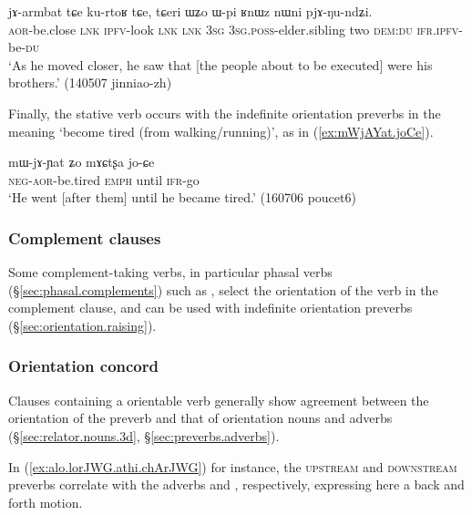 \begin{exe}
\ex \label{ex:jarmbat.kurtoR}
\gll  jɤ-armbat tɕe ku-rtoʁ tɕe, tɕeri ɯʑo ɯ-pi ʁnɯz nɯni pjɤ-ŋu-ndʑi. \\
\textsc{aor}-be.close \textsc{lnk} \textsc{ipfv}-look \textsc{lnk} \textsc{lnk} \textsc{3sg} \textsc{3sg}.\textsc{poss}-elder.sibling two \textsc{dem}:\textsc{du} \textsc{ifr}.\textsc{ipfv}-be-\textsc{du} \\
\glt `As he moved closer, he saw that [the people about to be executed] were his brothers.' (140507 jinniao-zh) 
\end{exe}

Finally, the stative verb  occurs with the indefinite orientation preverbs in the meaning `become tired (from walking/running)', as in (\ref{ex:mWjAYat.joCe}).

\begin{exe}
\ex \label{ex:mWjAYat.joCe}
\gll mɯ-jɤ-ɲat ʑo mɤɕtʂa jo-ɕe \\
\textsc{neg}-\textsc{aor}-be.tired \textsc{emph} until \textsc{ifr}-go \\
\glt `He went [after them] until he became tired.' (160706 poucet6) 
\end{exe}

\subsubsection{Complement clauses} \label{sec:orientation.complement.clause}
Some com\-ple\-ment-taking verbs, in particular phasal verbs (§\ref{sec:phasal.complements}) such as , select the orientation of the verb in the complement clause, and can be used with indefinite orientation preverbs (§\ref{sec:orientation.raising}). 

\subsubsection{Orientation concord} \label{sec:orientation.concord}
Clauses containing a orientable verb generally show agreement between the orientation of the preverb and that of orientation nouns and adverbs
(§\ref{sec:relator.nouns.3d}, §\ref{sec:preverbs.adverbs}). 

In (\ref{ex:alo.lorJWG.athi.chArJWG}) for instance, the \textsc{upstream}  and  \textsc{downstream} preverbs   correlate with the adverbs  and , respectively, expressing here a back and forth motion.

